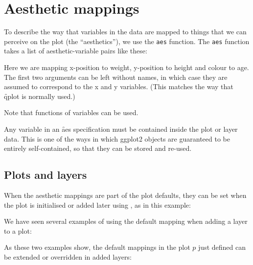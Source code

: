 
\section{Aesthetic mappings}
\label{sec:aes}

To describe the way that variables in the data are mapped to things that we can perceive on the plot (the ``aesthetics''), we use the {\tt aes} function.  The {\tt aes} function takes a list of aesthetic-variable pairs like these:

% 


Here we are mapping x-position to weight, y-position to height and colour to age.  The first two arguments can be left without names, in which case they are assumed to correspond to the x and y variables.  (This matches the way that \f{qplot} is normally used.)

% 

\noindent Note that functions of variables can be used.

Any variable in an \f{aes} specification must be contained inside the plot or layer data.  This is one of the ways in which ggplot2 objects are guaranteed to be entirely self-contained, so that they can be stored and re-used.

\subsection{Plots and layers}
\label{sub:plots_and_layers}

When the aesthetic mappings are part of the plot defaults, they can be set when the plot is initialised or added later using \code{+}, as in this example:

% 
%


We have seen several examples of using the default mapping when adding a layer to a plot:

% 


As these two examples show, the default mappings in the plot $p$ just defined  can be extended or overridden in added layers:

